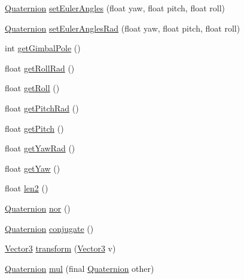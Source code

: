 \begin{DoxyCompactItemize}
\item 
\hyperlink{classairhockeyjava_1_1util_1_1_quaternion}{Quaternion} \hyperlink{classairhockeyjava_1_1util_1_1_quaternion_a2c366970be35798e24e1e930d3b1b031}{set\+Euler\+Angles} (float yaw, float pitch, float roll)
\item 
\hyperlink{classairhockeyjava_1_1util_1_1_quaternion}{Quaternion} \hyperlink{classairhockeyjava_1_1util_1_1_quaternion_a88f9e38ae38dad70844adb1f1018aad1}{set\+Euler\+Angles\+Rad} (float yaw, float pitch, float roll)
\item 
int \hyperlink{classairhockeyjava_1_1util_1_1_quaternion_a3982bdf47e1fe116d18ba8996e98bf58}{get\+Gimbal\+Pole} ()
\item 
float \hyperlink{classairhockeyjava_1_1util_1_1_quaternion_ad21b77cbe18b821382f408761a6865a0}{get\+Roll\+Rad} ()
\item 
float \hyperlink{classairhockeyjava_1_1util_1_1_quaternion_a0ab95d5aa528a24202321ab7b456001a}{get\+Roll} ()
\item 
float \hyperlink{classairhockeyjava_1_1util_1_1_quaternion_a17db7a37aba592642c4275b607549b65}{get\+Pitch\+Rad} ()
\item 
float \hyperlink{classairhockeyjava_1_1util_1_1_quaternion_afe6191acbcc04649549b859267236342}{get\+Pitch} ()
\item 
float \hyperlink{classairhockeyjava_1_1util_1_1_quaternion_adffd4fbd5fa6acc463762fc5a4bff1b0}{get\+Yaw\+Rad} ()
\item 
float \hyperlink{classairhockeyjava_1_1util_1_1_quaternion_ae6f37902ad9b6ca934e3494b0bff063a}{get\+Yaw} ()
\item 
float \hyperlink{classairhockeyjava_1_1util_1_1_quaternion_afbf880acba1440bb8bb13bebe371b51a}{len2} ()
\item 
\hyperlink{classairhockeyjava_1_1util_1_1_quaternion}{Quaternion} \hyperlink{classairhockeyjava_1_1util_1_1_quaternion_ad405665ca81541723e71cb6d7d9fb5b4}{nor} ()
\item 
\hyperlink{classairhockeyjava_1_1util_1_1_quaternion}{Quaternion} \hyperlink{classairhockeyjava_1_1util_1_1_quaternion_a188ced9cda4bbf86036b7e911728177c}{conjugate} ()
\item 
\hyperlink{classairhockeyjava_1_1util_1_1_vector3}{Vector3} \hyperlink{classairhockeyjava_1_1util_1_1_quaternion_a0b407593d6c1c042ab44002194206c96}{transform} (\hyperlink{classairhockeyjava_1_1util_1_1_vector3}{Vector3} v)
\item 
\hyperlink{classairhockeyjava_1_1util_1_1_quaternion}{Quaternion} \hyperlink{classairhockeyjava_1_1util_1_1_quaternion_a8a85f23b1b0388be82bb7da01dd504e9}{mul} (final \hyperlink{classairhockeyjava_1_1util_1_1_quaternion}{Quaternion} other)

\end{DoxyCompactItemize}
